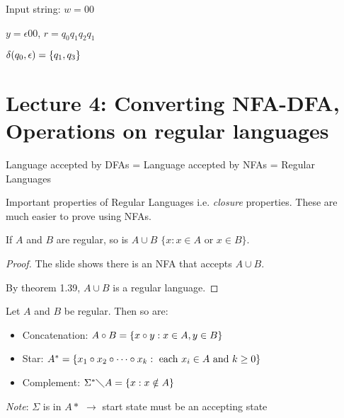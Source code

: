 Input string: $w = 00$

$y = \epsilon 00$, $r = q_0q_1q_2q_1$

$\delta(q_0, \epsilon) = \left \{ q_1, q_3 \right \}$

\section*{Lecture 4: Converting NFA-DFA, Operations on regular languages}

Language accepted by DFAs = Language accepted by NFAs = Regular Languages

Important properties of Regular Languages i.e. \emph{closure} properties. These are much easier to prove using NFAs.

\begin{theorem}
    If $A$ and $B$ are regular, so is $A \cup B$ $\{x: x \in A \text{ or } x \in B\}$.
\end{theorem}

\begin{proof}
    The slide shows there is an NFA that accepts $A \cup B$.

    By theorem 1.39, $A \cup B$ is a regular language.
\end{proof}

\begin{theorem}
    Let $A$ and $B$ be regular. Then so are:

    \begin{itemize}
        \item Concatenation: $A \circ B = \left \{ x \circ y: x \in A, y \in B \right \}$
        \item Star: $A^* = \left \{ x_1 \circ x_2 \circ \cdots \circ x_k: \text{ each } x_i \in A \text{ and } k \geq 0 \right \}$
        \item Complement: $\Sigma^* \diagdown A = \left \{ x: x \notin A \right \}$
    \end{itemize}

    \emph{Note}: $\Sigma$ is in $A*$ $\rightarrow$ start state must be an accepting state
\end{theorem}

